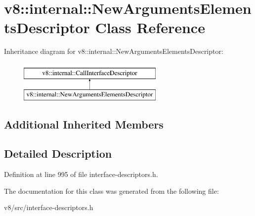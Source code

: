 \hypertarget{classv8_1_1internal_1_1NewArgumentsElementsDescriptor}{}\section{v8\+:\+:internal\+:\+:New\+Arguments\+Elements\+Descriptor Class Reference}
\label{classv8_1_1internal_1_1NewArgumentsElementsDescriptor}
Inheritance diagram for v8\+:\+:internal\+:\+:New\+Arguments\+Elements\+Descriptor\+:\begin{figure}[H]
\begin{center}
\leavevmode
\includegraphics[height=2.000000cm]{classv8_1_1internal_1_1NewArgumentsElementsDescriptor}
\end{center}
\end{figure}
\subsection*{Additional Inherited Members}


\subsection{Detailed Description}


Definition at line 995 of file interface-\/descriptors.\+h.



The documentation for this class was generated from the following file\+:\begin{DoxyCompactItemize}
\item 
v8/src/interface-\/descriptors.\+h\end{DoxyCompactItemize}
